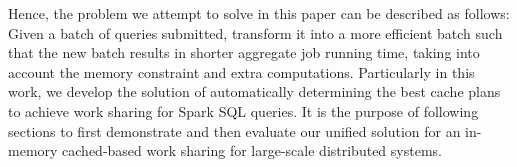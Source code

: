 Hence, the problem we attempt to solve in this paper can be described as follows: Given a batch of queries submitted, transform it into a more efficient batch such that the new batch results in shorter aggregate job running time, taking into account the memory constraint and extra computations. Particularly in this work, we develop the solution of automatically determining the best cache plans to achieve work sharing for Spark SQL queries. It is the purpose of following sections to first demonstrate and then evaluate our unified solution for an in-memory cached-based work sharing for large-scale distributed systems.